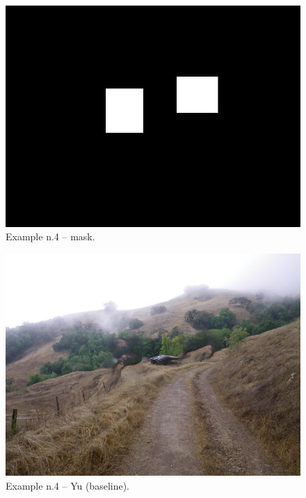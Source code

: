 \documentclass[a4paper, 11pt]{article}
\begin{document}
\begin{figure}
    \centering
    \includegraphics[width=.95\linewidth]{documentation/img/masks/0031_mask.png}
    \caption{Example n.4 -- mask.}
    \label{img:ex_n.4_mask}
\end{figure}
\begin{figure}
    \centering
    \includegraphics[width=.95\linewidth]{documentation/img/baseline/0031.png}
    \caption{Example n.4 -- Yu (baseline).}
    \label{img:ex_n.4_mask}
\end{figure}
\end{document}
